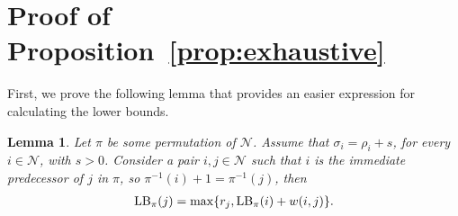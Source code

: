 \documentclass[a4paper]{article}
\theoremstyle{definition}
\theoremstyle{plain}
\newtheorem{lemma}{Lemma}
\begin{document}




\newpage

\appendix

\section{Proof of Proposition~\ref{prop:exhaustive}}

First, we prove the following lemma that provides an easier expression for
calculating the lower bounds.

\begin{lemma}\label{lb_lemma}
  Let $\pi$ be some permutation of $\mathcal{N}$. Assume that
  $\sigma_{i} = \rho_{i} + s$, for every $i \in \mathcal{N}$, with $s > 0$.
  Consider a pair $i,j \in \mathcal{N}$ such that $i$ is the immediate predecessor
  of $j$ in $\pi$, so $\pi^{-1}(i) + 1 = \pi^{-1}(j)$, then
\begin{align}
  \label{eq:lb_lemma}
  \text{\upshape LB}_\pi(j) = \max \{ r_{j}, \text{\upshape LB}_\pi(i) + w(i, j) \} .
\end{align}
\end{lemma}
\end{document}
